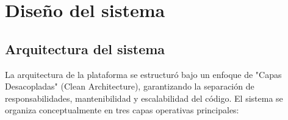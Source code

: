 \documentclass[12pt, atypical, journal]{article}
\begin{document}
\newpage

\section{Diseño del sistema}

\subsection{Arquitectura del sistema}
La arquitectura de la plataforma se estructuró bajo un enfoque de "Capas Desacopladas" (Clean Architecture), garantizando la separación de responsabilidades, mantenibilidad y escalabilidad del código. El sistema se organiza conceptualmente en tres capas operativas principales:
\end{document}

